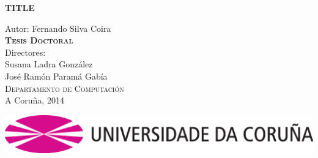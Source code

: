 \begin{titlepage}
\begin{center}


\vspace*{2cm}



{\LARGE \textbf {TITLE}}

\end{center}

\vspace*{1.5cm}

\begin{center}
\large
{\Large {Autor:}  %
Fernando Silva Coira}\\[1cm]

{ \textsc{\textbf{Tesis Doctoral}}} \\[1.5cm]
{{Directores:} \\
Susana Ladra Gonz\'alez\\
Jos\'e Ram\'on Param\'a Gab\'ia}\\[1.6cm]

{\large \scshape Departamento de Computaci\'on} \\[5mm]

{A Coru\~na, 2014}

\vspace*{1cm}

\includegraphics[scale=0.22]{figures/_init/udc-color}

\end{center}

\end{titlepage}

\thispagestyle{empty}
